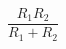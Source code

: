 \documentclass[12pt]{article}
\begin{document}
\sicpsize
\[
\frac{R_1R_2}{R_1 + R_2}
\]
\end{document}
